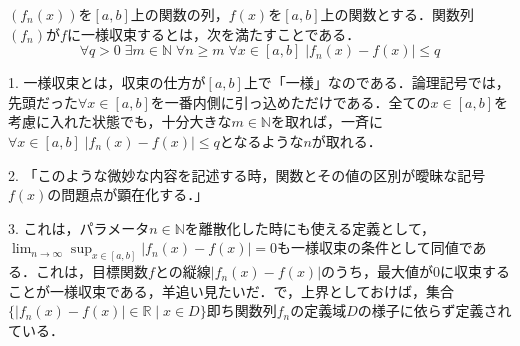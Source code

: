 \documentclass[uplatex, dvipdfmx]{jsreport}
\begin{document}
\begin{definition}
    $(f_n(x))$を$[a,b]$上の関数の列，$f(x)$を$[a,b]$上の関数とする．関数列$(f_n)$が$f$に一様収束するとは，次を満たすことである．
    \[ \forall q>0\; \exists m\in\mathbb{N}\; \forall n\ge m\;\forall x\in [a,b]\; |f_n(x)-f(x)|\le q \]
\end{definition}
\begin{remark*}
    1. 一様収束とは，収束の仕方が$[a,b]$上で「一様」なのである．論理記号では，先頭だった$\forall x\in [a,b]$を一番内側に引っ込めただけである．全ての$x\in [a,b]$を考慮に入れた状態でも，十分大きな$m\in\mathbb{N}$を取れば，一斉に$\forall x\in [a,b]\;|f_n(x)-f(x)|\le q$となるような$n$が取れる．

    2. 「このような微妙な内容を記述する時，関数とその値の区別が曖昧な記号$f(x)$の問題点が顕在化する．」

    3. これは，パラメータ$n\in\mathbb{N}$を離散化した時にも使える定義として，$\lim_{n\to\infty}\sup_{x\in [a,b]}|f_n(x)-f(x)|=0$も一様収束の条件として同値である．これは，目標関数$f$との縦線$|f_n(x)-f(x)|$のうち，最大値が$0$に収束することが一様収束である，羊追い見たいだ．で，上界としておけば，集合$\{|f_n(x)-f(x)|\in\mathbb{R}\mid x\in D\}$即ち関数列$f_n$の定義域$D$の様子に依らず定義されている．
\end{remark*}
\end{document}
